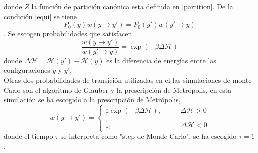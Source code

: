 \documentclass[a4paper]{article}
\begin{document}
donde $Z$ la función de partición canónica esta definida en \ref{partition}. De la condición \ref{equi} se tiene
\begin{equation}
P_0(y)w(y\rightarrow y')=P_0(y')w(y'\rightarrow y)
\end{equation}.
Se escogen probabilidades  que satisfacen 
\begin{equation}\label{probTans1}
\frac{w(y\rightarrow y')}{w(y'\rightarrow y)}=\exp (-\beta \Delta \mathcal{H})
\end{equation}
donde $\Delta\mathcal{H}=\mathcal{H}(y')-\mathcal{H}(y)$ es la diferencia de energías entre las configuraciones $y$ y $y'$.\\
Otras dos probabilidades de transición utilizadas en el las simulaciones de monte Carlo son el algoritmo de Glauber y la prescripción de Metrópolis, en esta simulación se ha escogido a la prescripción de Metrópolis,
\begin{equation}
w(y\rightarrow y')=\left\{
        \begin{array}{ll}
            \frac{1}{\tau}\exp (-\beta \Delta \mathcal{H}), & \quad\;\,\,\,\, \Delta\mathcal{H}> 0 \\\\
            \frac{1}{\tau}, & \quad\quad \Delta\mathcal{H}< 0
        \end{array}
    \right.
\end{equation}
donde el tiempo $\tau$ se interpreta como "step de Monde Carlo", se ha escogido $\tau=1$.
\end{document}

